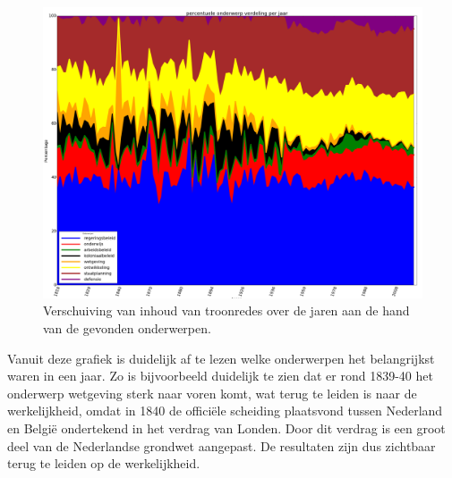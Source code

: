 \begin{figure}[H]
\hfill\includegraphics[width=1.2\textwidth,left]{fig/onderwerpverdeling}
\caption{\label{onderwerpverdeling} Verschuiving van inhoud van troonredes over de jaren aan de hand van de gevonden onderwerpen.}
\end{figure}

Vanuit deze grafiek is duidelijk af te lezen welke onderwerpen het belangrijkst waren in een jaar. Zo is bijvoorbeeld duidelijk te zien dat er rond 1839-40 het onderwerp wetgeving sterk naar voren komt, wat terug te leiden is naar de werkelijkheid, omdat in 1840 de officiële scheiding plaatsvond tussen Nederland en België ondertekend in het verdrag van Londen. Door dit verdrag is een groot deel van de Nederlandse grondwet aangepast. \citep{schroeder1996transformation} De resultaten zijn dus zichtbaar terug te leiden op de werkelijkheid.